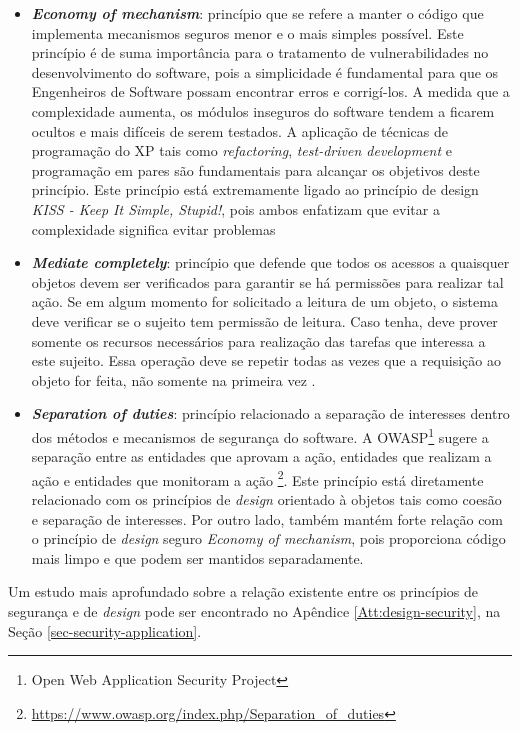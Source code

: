 \begin{itemize}
\item \textbf{\emph{Economy of mechanism}}: princípio que se refere a manter o código que implementa mecanismos seguros menor e o mais simples possível. Este princípio é de suma importância para o tratamento de vulnerabilidades no desenvolvimento do software, pois a simplicidade é fundamental para que os Engenheiros de Software possam encontrar erros e corrigí-los. A medida que a complexidade aumenta, os módulos inseguros do software tendem a ficarem ocultos e mais difíceis de serem testados. A aplicação de técnicas de programação do XP tais como \emph{refactoring}, \emph{test-driven development} e programação em pares são fundamentais para alcançar os objetivos deste princípio. Este princípio está extremamente ligado ao princípio de design \emph{KISS - Keep It Simple, Stupid!}, pois ambos enfatizam que evitar a complexidade significa evitar problemas \cite{mcgraw2002}

\item \textbf{\emph{Mediate completely}}: princípio que defende que todos os acessos a quaisquer objetos devem ser verificados para garantir se há permissões para realizar tal ação. Se em algum momento for solicitado a leitura de um objeto, o sistema deve verificar se o sujeito tem permissão de leitura. Caso tenha, deve prover somente os recursos necessários para realização das tarefas que interessa a este sujeito. Essa operação deve se repetir todas as vezes que a requisição ao objeto for feita, não somente na primeira vez \cite{bishop2003}.

\item \textbf{\emph{Separation of duties}}: princípio relacionado a separação de interesses dentro dos métodos e mecanismos de segurança do software. A OWASP\footnote{Open Web Application Security Project} sugere a separação entre as entidades que aprovam a ação, entidades que realizam a ação e entidades que monitoram a ação \footnote{\url{https://www.owasp.org/index.php/Separation_of_duties}}. Este princípio está diretamente relacionado com os princípios de \emph{design} orientado à objetos tais como coesão e separação de interesses. Por outro lado, também mantém forte relação com o princípio de \emph{design} seguro \emph{Economy of mechanism}, pois proporciona código mais limpo e que podem ser mantidos separadamente.
\end{itemize}

Um estudo mais aprofundado sobre a relação existente entre os princípios de segurança e de \emph{design} pode ser encontrado no Apêndice \ref{Att:design-security}, na Seção \ref{sec-security-application}.

